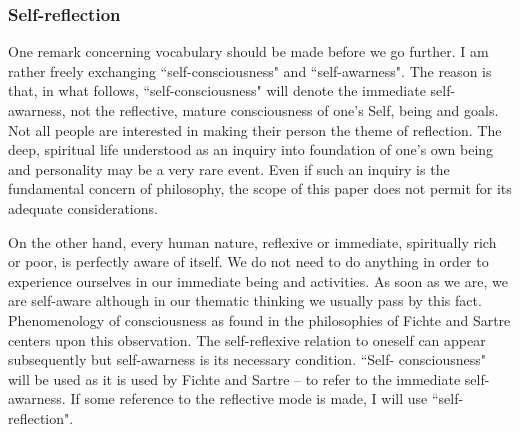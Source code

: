 \subsubsection{Self-reflection}
One remark concerning vocabulary should be made before we go further. 
I am rather freely exchanging ``self-consciousness" and ``self-awarness". 
The reason is that, in what follows, ``self-consciousness" will denote the 
immediate self-awarness, not the reflective, mature consciousness of one's Self, being and goals. Not all people are 
interested in making their person the theme of reflection. The deep, spiritual life understood as an inquiry into 
foundation of one's own being and personality may be a very rare event. Even if such 
an inquiry is the fundamental 
concern of philosophy, the scope of this paper does not permit for its adequate considerations. 

On the other hand, every human nature, reflexive or immediate, spiritually rich or poor, is perfectly aware of 
itself. We do not need to do anything in order to experience ourselves in our immediate being and activities. 
As soon as we are, we are self-aware although in our thematic thinking we usually pass by this fact. 
Phenomenology of consciousness as found in the philosophies of Fichte and Sartre centers upon this observation. 
The self-reflexive relation to oneself can appear subsequently but self-awarness is its necessary condition. ``Self-
consciousness" will be used as it is used by Fichte and Sartre -- to refer to the immediate self-awarness. If some 
reference to the reflective mode is made, I will use ``self-reflection".

